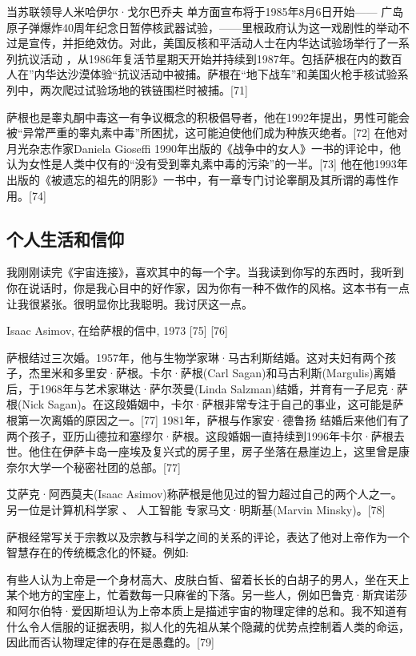 当苏联领导人米哈伊尔·戈尔巴乔夫 单方面宣布将于1985年8月6日开始—— 广岛原子弹爆炸40周年纪念日暂停核武器试验，——里根政府认为这一戏剧性的举动不过是宣传，并拒绝效仿。对此，美国反核和平活动人士在内华达试验场举行了一系列抗议活动 ，从1986年复活节星期天开始并持续到1987年。包括萨根在内的数百人在”内华达沙漠体验“抗议活动中被捕。萨根在“地下战车”和美国火枪手核试验系列中，两次爬过试验场地的铁链围栏时被捕。[71]

萨根也是睾丸酮中毒这一有争议概念的积极倡导者，他在1992年提出，男性可能会被“异常严重的睾丸素中毒”所困扰，这可能迫使他们成为种族灭绝者。[72] 在他对月光杂志作家Daniela Gioseffi 1990年出版的《战争中的女人》一书的评论中，他认为女性是人类中仅有的“没有受到睾丸素中毒的污染”的一半。[73] 他在他1993年出版的《被遗忘的祖先的阴影》一书中，有一章专门讨论睾酮及其所谓的毒性作用。[74]

\subsection{个人生活和信仰}
我刚刚读完《宇宙连接》，喜欢其中的每一个字。当我读到你写的东西时，我听到你在说话时，你是我心目中的好作家，因为你有一种不做作的风格。这本书有一点让我很紧张。很明显你比我聪明。我讨厌这一点。

Isaac Asimov, 在给萨根的信中, 1973 [75] [76]

萨根结过三次婚。1957年，他与生物学家琳·马古利斯结婚。这对夫妇有两个孩子，杰里米和多里安·萨根。卡尔·萨根(Carl Sagan)和马古利斯(Margulis)离婚后，于1968年与艺术家琳达·萨尔茨曼(Linda Salzman)结婚，并育有一子尼克·萨根(Nick Sagan)。在这段婚姻中，卡尔·萨根非常专注于自己的事业，这可能是萨根第一次离婚的原因之一。[77] 1981年，萨根与作家安·德鲁扬 结婚后来他们有了两个孩子，亚历山德拉和塞缪尔·萨根。这段婚姻一直持续到1996年卡尔·萨根去世。他住在伊萨卡岛一座埃及复兴式的房子里，房子坐落在悬崖边上，这里曾是康奈尔大学一个秘密社团的总部。[77]

艾萨克·阿西莫夫(Isaac Asimov)称萨根是他见过的智力超过自己的两个人之一。另一位是计算机科学家 、 人工智能 专家马文·明斯基(Marvin Minsky)。[78]

萨根经常写关于宗教以及宗教与科学之间的关系的评论，表达了他对上帝作为一个智慧存在的传统概念化的怀疑。例如:

有些人认为上帝是一个身材高大、皮肤白皙、留着长长的白胡子的男人，坐在天上某个地方的宝座上，忙着数每一只麻雀的下落。另一些人，例如巴鲁克·斯宾诺莎和阿尔伯特·爱因斯坦认为上帝本质上是描述宇宙的物理定律的总和。我不知道有什么令人信服的证据表明，拟人化的先祖从某个隐藏的优势点控制着人类的命运，因此而否认物理定律的存在是愚蠢的。[79]

